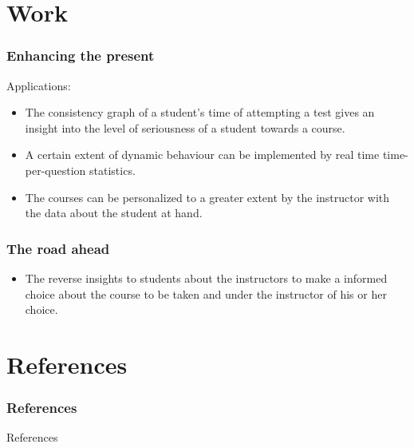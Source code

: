\documentclass[12pt,xcolor=dvipsnames]{beamer}
\begin{document}
\section{Work}
\begin{frame}[t]
\frametitle{Enhancing the present}

Applications:\\
\begin{itemize}
 \item The consistency graph of a student's time of attempting a test gives an insight into the level of seriousness of a student towards a course.\\
 \item A certain extent of dynamic behaviour can be implemented by real time time-per-question statistics.\\
 \item The courses can be personalized to a greater extent by the instructor with the data about the student at hand.\\
\end{itemize}

\end{frame}

\begin{frame}

\frametitle{The road ahead}

\begin{itemize}
\item The reverse insights to students about the instructors to make a informed choice about the course to be taken and under the instructor of his or her choice.
\end{itemize}
\end{frame}


\section{References}
\frametitle{References}
\begin{frame}[allowframebreaks]{References}


\end{frame}
\end{document}
